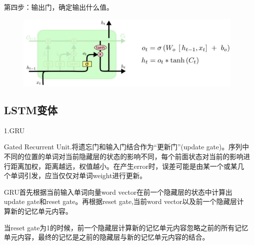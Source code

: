 \documentclass[openbib]{article}
\begin{document}
第四步：输出门，确定输出什么值。
\begin{figure}[htbp]
	\centering
	\includegraphics[scale=0.4]{确定输出值}
\end{figure}
\subsection{LSTM变体}
\begin{center}
	1.GRU
\end{center}

Gated Recurrent Unit.将遗忘门和输入门结合作为“更新门”(update gate)。序列中不同的位置的单词对当前隐藏层的状态的影响不同，每个前面状态对当前的影响进行距离加权，距离越远，权值越小。在产生error时，误差可能是由某一个或某几个单词引发，应当仅仅对单词weight进行更新。

GRU首先根据当前输入单词向量word vector在前一个隐藏层的状态中计算出update gate和reset gate。再根据reset gate,当前word vector以及前一个隐藏层计算新的记忆单元内容。

当reset gate为1的时候，前一个隐藏层计算新的记忆单元内容忽略之前的所有记忆单元内容，最终的记忆是之前的隐藏层与新的记忆单元内容的结合。
\end{document}
